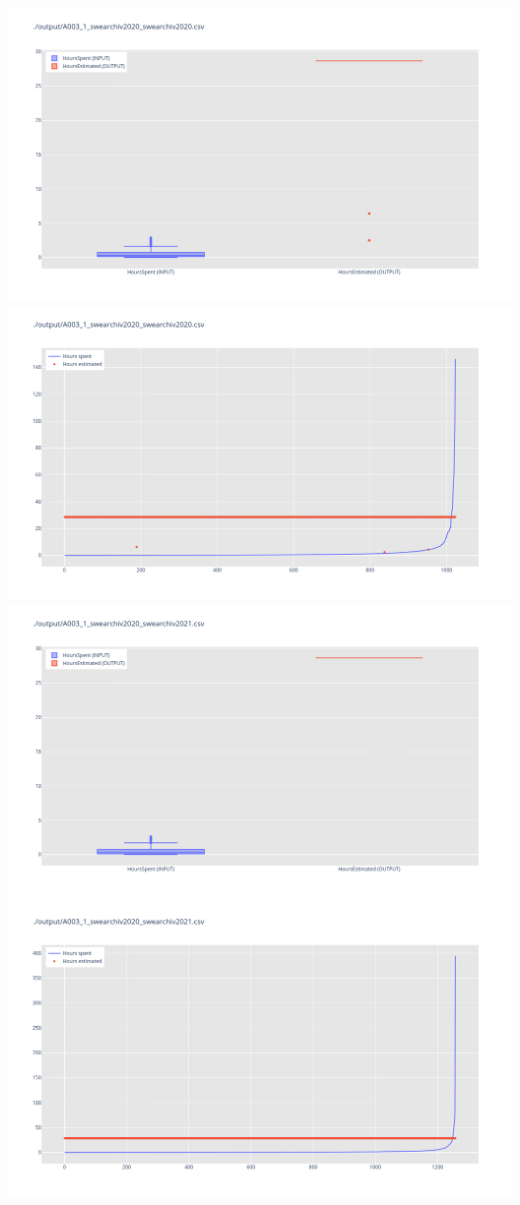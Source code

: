 \includegraphics[width=\textwidth]{Scripts/output/A003_1_swearchiv2020_swearchiv2020.csv.png}
\includegraphics[width=\textwidth]{Scripts/output/A003_1_swearchiv2020_swearchiv2020.csv.scatter.png}
\includegraphics[width=\textwidth]{Scripts/output/A003_1_swearchiv2020_swearchiv2021.csv.png}
\includegraphics[width=\textwidth]{Scripts/output/A003_1_swearchiv2020_swearchiv2021.csv.scatter.png}
